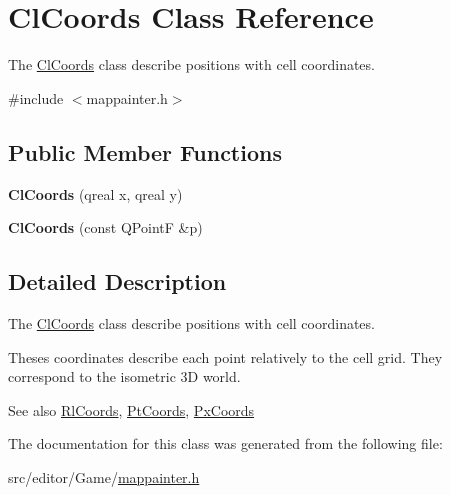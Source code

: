\hypertarget{class_cl_coords}{\section{\-Cl\-Coords \-Class \-Reference}
\label{class_cl_coords}
}


\-The \hyperlink{class_cl_coords}{\-Cl\-Coords} class describe positions with cell coordinates.  




{\ttfamily \#include $<$mappainter.\-h$>$}

\subsection*{\-Public \-Member \-Functions}
\begin{DoxyCompactItemize}
\item 
\hypertarget{class_cl_coords_a45685abe9c81595e2926edc414b425e7}{{\bfseries \-Cl\-Coords} (qreal x, qreal y)}\label{class_cl_coords_a45685abe9c81595e2926edc414b425e7}

\item 
\hypertarget{class_cl_coords_a48c6c4a46561da6e0a14ca6f3483426a}{{\bfseries \-Cl\-Coords} (const \-Q\-Point\-F \&p)}\label{class_cl_coords_a48c6c4a46561da6e0a14ca6f3483426a}

\end{DoxyCompactItemize}


\subsection{\-Detailed \-Description}
\-The \hyperlink{class_cl_coords}{\-Cl\-Coords} class describe positions with cell coordinates. 

\-Theses coordinates describe each point relatively to the cell grid. \-They correspond to the isometric 3\-D world.

\begin{DoxySeeAlso}{\-See also}
\hyperlink{class_rl_coords}{\-Rl\-Coords}, \hyperlink{class_pt_coords}{\-Pt\-Coords}, \hyperlink{class_px_coords}{\-Px\-Coords} 
\end{DoxySeeAlso}


\-The documentation for this class was generated from the following file\-:\begin{DoxyCompactItemize}
\item 
src/editor/\-Game/\hyperlink{mappainter_8h}{mappainter.\-h}\end{DoxyCompactItemize}
